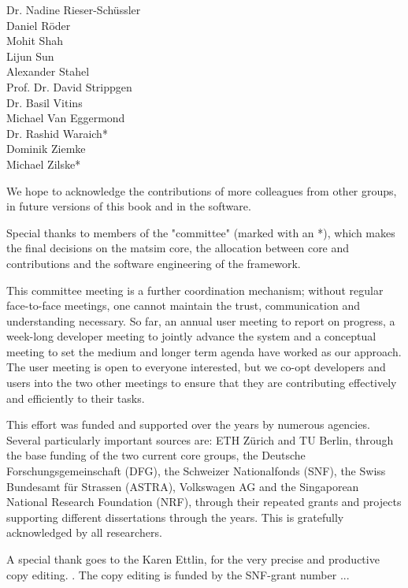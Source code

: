 \begin{multicols}{3}
Dr. Nadine Rieser-Schüssler \\
Daniel Röder \\
Mohit Shah \\
Lijun Sun \\
Alexander Stahel \\
Prof. Dr. David Strippgen \\
Dr. Basil Vitins \\
Michael Van Eggermond \\
Dr. Rashid Waraich\mbox{*} \\
Dominik Ziemke \\
Michael Zilske\mbox{*} \\
\end{multicols}
% 
We hope to acknowledge the contributions of more colleagues from other groups, in future versions of this book and in the software.   

Special thanks to members of the "committee" (marked with an \mbox{*}), which makes the final decisions on the \gls{matsim} core, the allocation between core and contributions and the software engineering of the \gls{framework}.

This committee meeting is a further coordination mechanism; without regular face-to-face meetings, one cannot maintain the trust, communication and understanding necessary. So far, an annual user meeting to report on progress, a week-long developer meeting to jointly advance the system and a conceptual meeting to set the medium and longer term agenda have worked as our approach. The user meeting is open to everyone interested, but we co-opt developers and users into the two other meetings to ensure that they are contributing effectively and efficiently to their tasks. 

This effort was funded and supported over the years by numerous agencies. Several particularly important sources are: ETH Zürich and TU Berlin, through the base funding of the two current core groups, the Deutsche Forschungsgemeinschaft (DFG), the Schweizer Nationalfonds (SNF), the Swiss Bundesamt für Strassen (ASTRA), Volkswagen AG and the Singaporean National Research Foundation (NRF), through their repeated grants and projects supporting different dissertations through the years. This is gratefully acknowledged by all researchers. 

A special thank goes to the Karen Ettlin, for the very precise and productive copy editing. . The copy editing is funded by the SNF-grant number ... 

